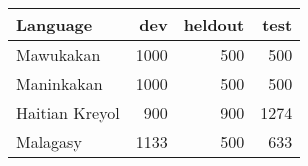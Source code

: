 
\begin{tabular}{lrrr}
\toprule
Language & dev & heldout & test \\
\toprule
Mawukakan &  1000 & 500 & 500 \\
Maninkakan &  1000 & 500 & 500 \\
Haitian Kreyol & 900 & 900 & 1274 \\
Malagasy &  1133 & 500 & 633 \\
\bottomrule
\end{tabular}

